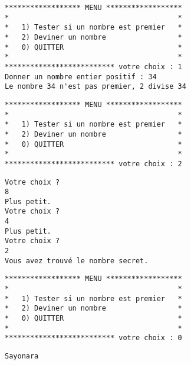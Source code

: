 \begin{multicols}{2} 
\footnotesize\setlength{\columnseprule}{0.3pt}
\begin{verbatim}
****************** MENU ******************
*                                        *
*   1) Tester si un nombre est premier   *
*   2) Deviner un nombre                 *
*   0) QUITTER                           *
*                                        *
************************** votre choix : 1
Donner un nombre entier positif : 34
Le nombre 34 n'est pas premier, 2 divise 34
\end{verbatim}
\begin{verbatim}
****************** MENU ******************
*                                        *
*   1) Tester si un nombre est premier   *
*   2) Deviner un nombre                 *
*   0) QUITTER                           *
*                                        *
************************** votre choix : 2
\end{verbatim}
\begin{verbatim}
Votre choix ?
8
Plus petit.
Votre choix ?
4
Plus petit.
Votre choix ?
2
Vous avez trouvé le nombre secret.
\end{verbatim}
\begin{verbatim}
****************** MENU ******************
*                                        *
*   1) Tester si un nombre est premier   *
*   2) Deviner un nombre                 *
*   0) QUITTER                           *
*                                        *
************************** votre choix : 0
\end{verbatim}
\begin{verbatim}
Sayonara
\end{verbatim}\\[2cm]
 ~
\end{multicols}

